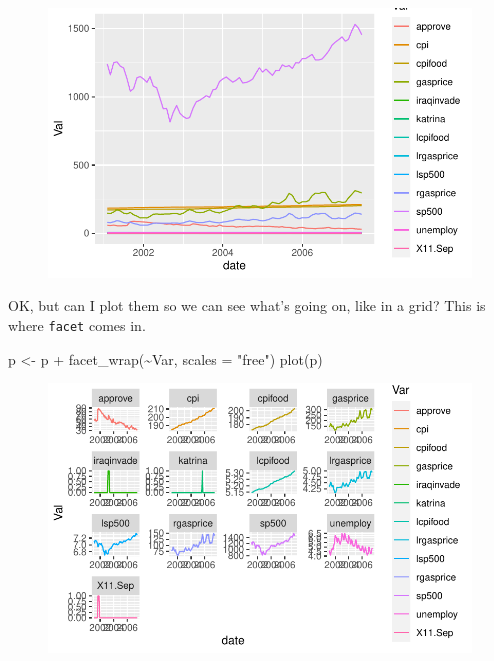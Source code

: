 \documentclass[
  letterpaper,
]{book}
\newenvironment{Shaded}{\begin{snugshade}}{\end{snugshade}}
\newcommand{\AttributeTok}[1]{\textcolor[rgb]{0.40,0.45,0.13}{#1}}
\newcommand{\FunctionTok}[1]{\textcolor[rgb]{0.28,0.35,0.67}{#1}}
\newcommand{\NormalTok}[1]{\textcolor[rgb]{0.00,0.23,0.31}{#1}}
\newcommand{\OtherTok}[1]{\textcolor[rgb]{0.00,0.23,0.31}{#1}}
\newcommand{\SpecialCharTok}[1]{\textcolor[rgb]{0.37,0.37,0.37}{#1}}
\newcommand{\StringTok}[1]{\textcolor[rgb]{0.13,0.47,0.30}{#1}}
\begin{document}
\begin{figure}[H]

{\centering \includegraphics{Appendix1_files/figure-pdf/unnamed-chunk-9-1.pdf}

}

\end{figure}

OK, but can I plot them so we can see what's going on, like in a grid?
This is where \texttt{facet} comes in.

\begin{Shaded}
\begin{Highlighting}[]
\NormalTok{p  }\OtherTok{\textless{}{-}}\NormalTok{ p }\SpecialCharTok{+}
  \FunctionTok{facet\_wrap}\NormalTok{(}\SpecialCharTok{\textasciitilde{}}\NormalTok{Var, }\AttributeTok{scales =} \StringTok{"free"}\NormalTok{)}
\FunctionTok{plot}\NormalTok{(p)}
\end{Highlighting}
\end{Shaded}

\begin{figure}[H]

{\centering \includegraphics{Appendix1_files/figure-pdf/unnamed-chunk-10-1.pdf}

}

\end{figure}
\end{document}
